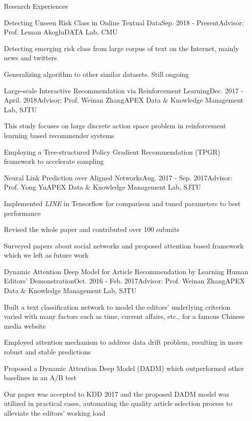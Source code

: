 \documentclass{resume} %
\begin{document}
\begin{rSection}{Research Experiences}
\begin{rSubsection}{Detecting Unseen Risk Class in Online Textual Data}{Sep. 2018 - Present}{Advisor: Prof. Leman Akoglu}{DATA Lab, CMU}
\item Detecting emerging risk class from large corpus of text on the Internet, mainly news and twitters
\item Generalizing algorithm to other similar datasets. Still ongoing
\end{rSubsection}
\begin{rSubsection}{Large-scale Interactive Recommendation via Reinforcement Learning}{Dec. 2017 - April. 2018}{Advisor: Prof. Weinan Zhang}{APEX Data $\&$ Knowledge Management Lab, SJTU}
\item This study focuses on large discrete action space problem in reinforcement learning based recommender systems
\item Employing a Tree-structured Policy Gradient Recommendation (TPGR) framework to accelerate sampling
\end{rSubsection}
\begin{rSubsection}{Neural Link Prediction over Aligned Networks}{Aug. 2017 - Sep. 2017}{Advisor: Prof. Yong Yu}{APEX Data $\&$ Knowledge Management Lab, SJTU}
\item Implemented \emph{LINE} in Tensorflow for comparison and tuned parameters to best performance
\item Revised the whole paper and contributed over 100 submits 
\item Surveyed papers about social networks and proposed attention based framework which we left as future work
\end{rSubsection}
\vspace{20pt}
\begin{rSubsection}{Dynamic Attention Deep Model for Article Recommendation
by Learning Human Editors’ Demonstration}{Oct. 2016 - Feb. 2017}{Advisor: Prof. Weinan Zhang}{APEX Data $\&$ Knowledge Management Lab, SJTU}
\item Built a text classification network to model the editors' underlying criterion varied with many factors such as time, current affairs, etc., for a famous Chinese media website
\item Employed attention mechanism to address data drift problem, resulting in more robust and stable predictions
\item Proposed a Dynamic Attention Deep Model (DADM) which outperformed other baselines in an A/B test
\item Our paper was accepted to KDD 2017 and the proposed DADM model was utilized in practical cases, automating the quality article selection process to alleviate the editors' working load\\\\
\end{rSubsection}
\end{rSection}
\end{document}
